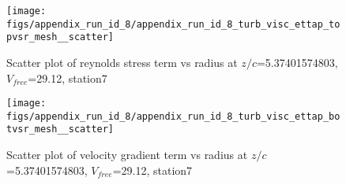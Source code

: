 \begin{figure}[H]
\centering
\texttt{[image: figs/appendix\_run\_id\_8/appendix\_run\_id\_8\_turb\_visc\_ettap\_topvsr\_mesh\_\_scatter]}
\caption{Scatter plot of reynolds stress term vs radius at $z/c$=5.37401574803, $V_{free}$=29.12, station7}
\label{fig:appendix_run_id_8_turb_visc_ettap_topvsr_mesh__scatter}
\end{figure}


\begin{figure}[H]
\centering
\texttt{[image: figs/appendix\_run\_id\_8/appendix\_run\_id\_8\_turb\_visc\_ettap\_botvsr\_mesh\_\_scatter]}
\caption{Scatter plot of velocity gradient term vs radius at $z/c$=5.37401574803, $V_{free}$=29.12, station7}
\label{fig:appendix_run_id_8_turb_visc_ettap_botvsr_mesh__scatter}
\end{figure}


